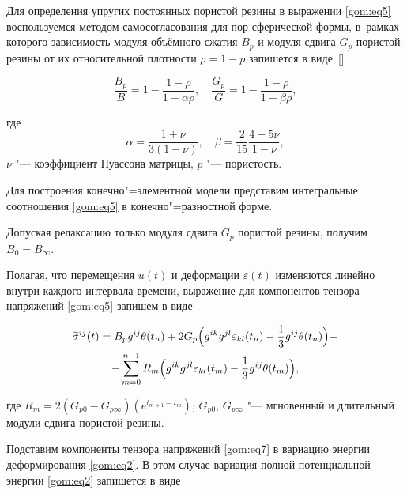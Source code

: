 Для определения упругих постоянных пористой резины в выражении \eqref{gom:eq5} воспользуемся методом самосогласования для пор сферической формы, в~рамках которого зависимость модуля объёмного сжатия $B_{p}$ и модуля сдвига $G_{p}$ пористой резины от их относительной плотности $\rho=1-p$ запишется в виде~[]

\begin{equation}

\frac{B_{p}}{B}=1-\frac{1-\rho}{1-\alpha\rho}, \quad  \frac{G_{p}}{G}=1-\frac{1-\rho}{1-\beta\rho}, 

\label{gom:eq6}

\end{equation}

где $$\alpha=\frac{1+\nu}{3(1-\nu)}, \quad  \beta=\frac{2}{15}\frac{4-5\nu}{1-\nu},$$ $\nu$ "--- коэффициент Пуассона матрицы, $p$ "--- пористость.



Для построения конечно"=элементной модели представим интегральные соотношения \eqref{gom:eq5} в конечно"=разностной форме. 

Допуская релаксацию только модуля сдвига $G_{p}$ пористой резины, получим $B_{0}=B_{\infty}$. 

Полагая, что перемещения $u(t)$ и деформации $\varepsilon(t)$ изменяются линейно внутри каждого интервала времени, выражение для компонентов тензора напряжений \eqref{gom:eq5} запишем в виде

\begin{multline}

\widetilde{\sigma}^{ij}(t)=B_{p}g^{ij}\theta(t_{n})+2G_{p}

\Bigl(g^{ik}g^{jl}\varepsilon_{kl}(t_{n})-\frac{1}{3}g^{ij}\theta(t_{n})\Bigr)-

\\

-\sum_{m=0}^{n-1}R_{m}\Bigl(g^{ik}g^{jl}\varepsilon_{kl}(t_{m})-\frac{1}{3}g^{ij}\theta(t_{m})\Bigr), 

\label{gom:eq7}

\end{multline}

где $R_{m}=2(G_{p0}-G_{p\infty})(e^{t_{m+1}-t_{m}})$; $G_{p0}$, $G_{p\infty}$ "--- мгновенный и длительный модули сдвига пористой резины.



Подставим компоненты тензора напряжений \eqref{gom:eq7} в вариацию энергии деформирования \eqref{gom:eq2}. В этом случае вариация полной потенциальной энергии \eqref{gom:eq2} запишется в виде

